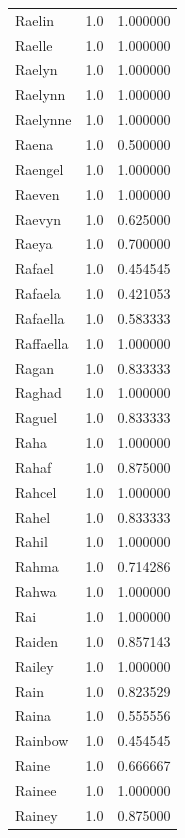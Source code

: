 \documentclass[
  letterpaper,
  DIV=11,
  numbers=noendperiod]{scrreprt}
\begin{document}
\begin{tabular}{lrr}
Raelin          &   1.0 &   1.000000 \\
Raelle          &   1.0 &   1.000000 \\
Raelyn          &   1.0 &   1.000000 \\
Raelynn         &   1.0 &   1.000000 \\
Raelynne        &   1.0 &   1.000000 \\
Raena           &   1.0 &   0.500000 \\
Raengel         &   1.0 &   1.000000 \\
Raeven          &   1.0 &   1.000000 \\
Raevyn          &   1.0 &   0.625000 \\
Raeya           &   1.0 &   0.700000 \\
Rafael          &   1.0 &   0.454545 \\
Rafaela         &   1.0 &   0.421053 \\
Rafaella        &   1.0 &   0.583333 \\
Raffaella       &   1.0 &   1.000000 \\
Ragan           &   1.0 &   0.833333 \\
Raghad          &   1.0 &   1.000000 \\
Raguel          &   1.0 &   0.833333 \\
Raha            &   1.0 &   1.000000 \\
Rahaf           &   1.0 &   0.875000 \\
Rahcel          &   1.0 &   1.000000 \\
Rahel           &   1.0 &   0.833333 \\
Rahil           &   1.0 &   1.000000 \\
Rahma           &   1.0 &   0.714286 \\
Rahwa           &   1.0 &   1.000000 \\
Rai             &   1.0 &   1.000000 \\
Raiden          &   1.0 &   0.857143 \\
Railey          &   1.0 &   1.000000 \\
Rain            &   1.0 &   0.823529 \\
Raina           &   1.0 &   0.555556 \\
Rainbow         &   1.0 &   0.454545 \\
Raine           &   1.0 &   0.666667 \\
Rainee          &   1.0 &   1.000000 \\
Rainey          &   1.0 &   0.875000 \\

\end{tabular}
\end{document}
